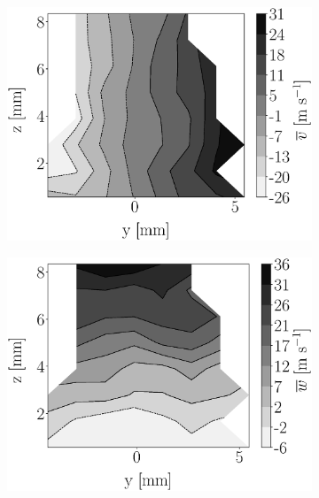 \begin{figure}[h!]
\begin{subfigure}[b]{0.22\textwidth}
\end{subfigure}
   \hspace{0.17in}
\begin{subfigure}[b]{0.22\textwidth}
	\centering
   \includegraphics[scale=0.17]{./part2_developments/figures_ch5_resolved_JICF/injectors_SLI/uG75_dx10_x10_uy_mean_map.eps}
\end{subfigure}
   \hspace{0.17in}
\begin{subfigure}[b]{0.22\textwidth}
	\centering
   \includegraphics[scale=0.17]{./part2_developments/figures_ch5_resolved_JICF/injectors_SLI/uG75_dx10_x10_uz_mean_map.eps}
\end{subfigure}


\end{figure}
